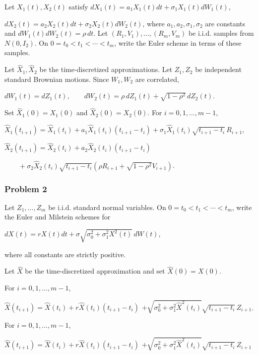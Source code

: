  Let $X_1(t),X_2(t)$ satisfy
$dX_1(t)=a_1X_1(t)dt+\sigma_1X_1(t)dW_1(t)$,

$dX_2(t)=a_2X_2(t)dt+\sigma_2X_2(t)dW_2(t)$,
where $a_1,a_2,\sigma_1,\sigma_2$ are constants and $dW_1(t)dW_2(t)=\rho\,dt$. Let $(R_1,V_1),\ldots,(R_m,V_m)$ be i.i.d. samples from $N(0,I_2)$. On $0=t_0<t_1<\cdots<t_m$, write the Euler scheme in terms of these samples.

 Let $\widehat X_1,\widehat X_2$ be the time-discretized approximations. Let $Z_1,Z_2$ be independent standard Brownian motions. Since $W_1,W_2$ are correlated,

$dW_1(t)=dZ_1(t),\qquad dW_2(t)=\rho\,dZ_1(t)+\sqrt{1-\rho^2}\,dZ_2(t)$.

Set $\widehat X_1(0)=X_1(0)$ and $\widehat X_2(0)=X_2(0)$. For $i=0,1,\ldots,m-1$,

$\widehat X_1(t_{i+1})=\widehat X_1(t_i)+a_1\widehat X_1(t_i)(t_{i+1}-t_i)+\sigma_1\widehat X_1(t_i)\sqrt{t_{i+1}-t_i}\,R_{i+1}$,

$\widehat X_2(t_{i+1})=\widehat X_2(t_i)+a_2\widehat X_2(t_i)(t_{i+1}-t_i)$

$\qquad+\sigma_2\widehat X_2(t_i)\sqrt{t_{i+1}-t_i}\left(\rho R_{i+1}+\sqrt{1-\rho^2}V_{i+1}\right)$.

\subsubsection*{Problem 2}

 Let $Z_1,\ldots,Z_m$ be i.i.d. standard normal variables. On $0=t_0<t_1<\cdots<t_m$, write the Euler and Milstein schemes for

$dX(t)=rX(t)dt+\sigma\sqrt{\sigma_0^2+\sigma_1^2X^2(t)}\,dW(t)$,

where all constants are strictly positive.

 Let $\widehat X$ be the time-discretized approximation and set $\widehat X(0)=X(0)$.

 For $i=0,1,\ldots,m-1$,

$\widehat X(t_{i+1})=\widehat X(t_i)+r\widehat X(t_i)(t_{i+1}-t_i)$
$+\sqrt{\sigma_0^2+\sigma_1^2\widehat X^2(t_i)}\sqrt{t_{i+1}-t_i}\,Z_{i+1}$.

 For $i=0,1,\ldots,m-1$,

$\widehat X(t_{i+1})=\widehat X(t_i)+r\widehat X(t_i)(t_{i+1}-t_i)$
$+\sqrt{\sigma_0^2+\sigma_1^2\widehat X^2(t_i)}\sqrt{t_{i+1}-t_i}\,Z_{i+1}$

